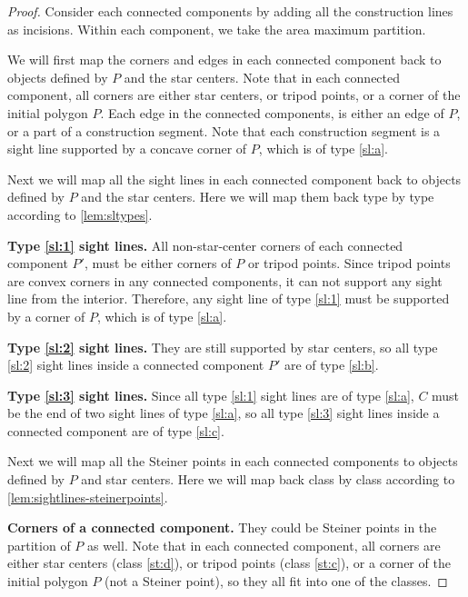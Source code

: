 \documentclass[10pt,a4paper]{article}
\begin{document}
\begin{proof}
    Consider each connected components by adding all the construction lines as incisions. 
    Within each component, we take the area maximum partition. 

    We will first map the corners and edges in each connected component back to objects defined by $P$ and the star centers. 
    Note that in each connected component, all corners are either star centers, or tripod points, or a corner of the initial polygon $P$. 
    Each edge in the connected components, is either an edge of $P$, or a part of a construction segment. 
    Note that each construction segment is a sight line supported by a concave corner of $P$, which is of type \ref{sl:a}. 

    Next we will map all the sight lines in each connected component back to objects defined by $P$ and the star centers. 
    Here we will map them back type by type according to \cref{lem:sltypes}. 
    
    \textbf{\boldmath Type \ref{sl:1} sight lines. }
    All non-star-center corners of each connected component $P'$, must be either corners of $P$ or tripod points. 
    Since tripod points are convex corners in any connected components, it can not support any sight line from the interior. 
    Therefore, any sight line of type \ref{sl:1} must be supported by a corner of $P$, which is of type \ref{sl:a}. 

    \textbf{\boldmath Type \ref{sl:2} sight lines. }
    They are still supported by star centers, so all type \ref{sl:2} sight lines inside a connected component $P'$ are of type \ref{sl:b}. 

    \textbf{\boldmath Type \ref{sl:3} sight lines. }
    Since all type \ref{sl:1} sight lines are of type \ref{sl:a}, $C$ must be the end of two sight lines of type \ref{sl:a}, so all type \ref{sl:3} sight lines inside a connected component are of type \ref{sl:c}. 

    Next we will map all the Steiner points in each connected components to objects defined by $P$ and star centers. 
    Here we will map back class by class according to \cref{lem:sightlines-steinerpoints}. 

    \textbf{\boldmath Corners of a connected component. }
    They could be Steiner points in the partition of $P$ as well. 
    Note that in each connected component, all corners are either star centers (class \ref{st:d}), or tripod points (class \ref{st:c}), or a corner of the initial polygon $P$ (not a Steiner point), so they all fit into one of the classes. 
    

\end{proof}
\end{document}

